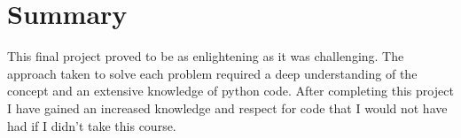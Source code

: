 \documentclass[twocolumn]{revtex4}
\begin{document}
\section{Summary}
This final project proved to be as enlightening as it was challenging. The approach taken to solve each problem required a deep understanding of the concept and an extensive knowledge of python code.  After completing this project I have gained an increased knowledge and respect for code that I would not have had if I didn't take this course.
\end{document}
